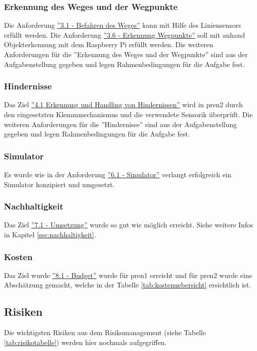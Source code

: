 \documentclass[../main.tex]{subfiles}
\begin{document}
\subsubsection{Erkennung des Weges und der Wegpunkte}

Die Anforderung \hyperlink{A3.1}{''3.1 - Befahren des Weges''} kann mit Hilfe des Liniensensors erfüllt werden. Die Anforderung \hyperlink{A3.6}{''3.6 - Erkennung Wegpunkte''} soll mit anhand Objekterkennung mit dem Raspberry Pi erfüllt werden. Die weiteren Anforderungen für die ''Erkennung des Weges und der Wegpunkte'' sind aus der Aufgabenstellung gegeben und legen Rahmenbedingungen für die Aufgabe fest.

\subsubsection{Hindernisse}

Das Ziel \hyperlink{A4.1}{''4.1 Erkennung und Handling von Hindernissen''} wird in \acrshort{pren2} durch den eingesetzten Klemmmechanismus und die verwendete Sensorik überprüft. Die weiteren Anforderungen für die ''Hindernisse'' sind aus der Aufgabenstellung gegeben und legen Rahmenbedingungen für die Aufgabe fest.

\subsubsection{Simulator}

Es wurde wie in der Anforderung \hyperlink{A6.1}{''6.1 - Simulator''} verlangt erfolgreich ein Simulator konzipiert und umgesetzt.

\subsubsection{Nachhaltigkeit}

Das Ziel \hyperlink{A7.1}{''7.1 - Umsetzung''} wurde so gut wie möglich erreicht. Siehe weitere Infos in Kapitel \ref{sec:nachhaltigkeit}.

\subsubsection{Kosten}

Das Ziel wurde  \hyperlink{A8.1}{''8.1 - Budget''} wurde für \acrshort{pren1} erreicht und für \acrshort{pren2} wurde eine Abschätzung gemacht, welche in der Tabelle \ref{tab:kostenuebersicht} ersichtlich ist.

\newpage
\subsection{Risiken}
Die wichtigsten Risiken aus dem Risikomanagement (siehe Tabelle \ref{tab:risikotabelle}) werden hier nochmals aufgegriffen.
\end{document}

